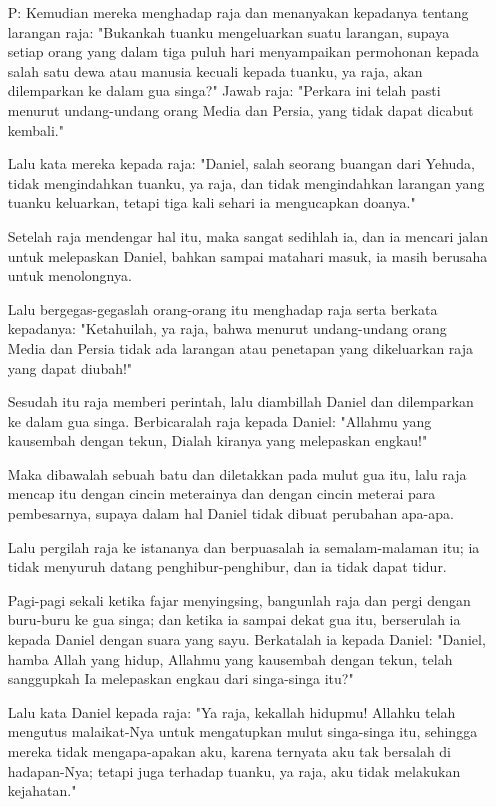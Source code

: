 \documentclass[a5paper,headsepline,titlepage,12pt,nnormalheadings,DIVcalc,twoside]{scrbook}
\newcommand{\BP}[1]{\begin{itemize} \item[P:] #1 \end{itemize}}
\begin{document}
\BP{Kemudian mereka menghadap raja dan menanyakan kepadanya tentang larangan raja: "Bukankah tuanku mengeluarkan suatu larangan, supaya setiap orang yang dalam tiga puluh hari menyampaikan permohonan kepada salah satu dewa atau manusia kecuali kepada tuanku, ya raja, akan dilemparkan ke dalam gua singa?" Jawab raja: "Perkara ini telah pasti menurut undang-undang orang Media dan Persia, yang tidak dapat dicabut kembali."

Lalu kata mereka kepada raja: "Daniel, salah seorang buangan dari Yehuda, tidak mengindahkan tuanku, ya raja, dan tidak mengindahkan larangan yang tuanku keluarkan, tetapi tiga kali sehari ia mengucapkan doanya."

Setelah raja mendengar hal itu, maka sangat sedihlah ia, dan ia mencari jalan untuk melepaskan Daniel, bahkan sampai matahari masuk, ia masih berusaha untuk menolongnya.

Lalu bergegas-gegaslah orang-orang itu menghadap raja serta berkata kepadanya: "Ketahuilah, ya raja, bahwa menurut undang-undang orang Media dan Persia tidak ada larangan atau penetapan yang dikeluarkan raja yang dapat diubah!"

Sesudah itu raja memberi perintah, lalu diambillah Daniel dan dilemparkan ke dalam gua singa. Berbicaralah raja kepada Daniel: "Allahmu yang kausembah dengan tekun, Dialah kiranya yang melepaskan engkau!"

Maka dibawalah sebuah batu dan diletakkan pada mulut gua itu, lalu raja mencap itu dengan cincin meterainya dan dengan cincin meterai para pembesarnya, supaya dalam hal Daniel tidak dibuat perubahan apa-apa.

Lalu pergilah raja ke istananya dan berpuasalah ia semalam-malaman itu; ia tidak menyuruh datang penghibur-penghibur, dan ia tidak dapat tidur.

Pagi-pagi sekali ketika fajar menyingsing, bangunlah raja dan pergi dengan buru-buru ke gua singa;
dan ketika ia sampai dekat gua itu, berserulah ia kepada Daniel dengan suara yang sayu. Berkatalah ia kepada Daniel: "Daniel, hamba Allah yang hidup, Allahmu yang kausembah dengan tekun, telah sanggupkah Ia melepaskan engkau dari singa-singa itu?"

Lalu kata Daniel kepada raja: "Ya raja, kekallah hidupmu!
Allahku telah mengutus malaikat-Nya untuk mengatupkan mulut singa-singa itu, sehingga mereka tidak mengapa-apakan aku, karena ternyata aku tak bersalah di hadapan-Nya; tetapi juga terhadap tuanku, ya raja, aku tidak melakukan kejahatan."

}
\end{document}

